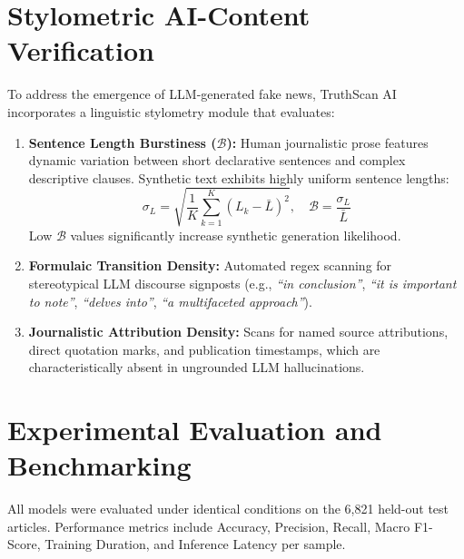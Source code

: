 \documentclass[11pt,a4paper]{article}
\begin{document}
\section{Stylometric AI-Content Verification}
To address the emergence of LLM-generated fake news, TruthScan AI incorporates a linguistic stylometry module that evaluates:
\begin{enumerate}[leftmargin=*]
    \item \textbf{Sentence Length Burstiness ($\mathcal{B}$):}
    Human journalistic prose features dynamic variation between short declarative sentences and complex descriptive clauses. Synthetic text exhibits highly uniform sentence lengths:
    \begin{equation}
    \sigma_L = \sqrt{\frac{1}{K}\sum_{k=1}^K (L_k - \bar{L})^2}, \quad \mathcal{B} = \frac{\sigma_L}{\bar{L}}
    \end{equation}
    Low $\mathcal{B}$ values significantly increase synthetic generation likelihood.
    
    \item \textbf{Formulaic Transition Density:}
    Automated regex scanning for stereotypical LLM discourse signposts (e.g., \textit{``in conclusion''}, \textit{``it is important to note''}, \textit{``delves into''}, \textit{``a multifaceted approach''}).
    
    \item \textbf{Journalistic Attribution Density:}
    Scans for named source attributions, direct quotation marks, and publication timestamps, which are characteristically absent in ungrounded LLM hallucinations.
\end{enumerate}

\section{Experimental Evaluation and Benchmarking}
All models were evaluated under identical conditions on the 6,821 held-out test articles. Performance metrics include Accuracy, Precision, Recall, Macro F1-Score, Training Duration, and Inference Latency per sample.
\end{document}
